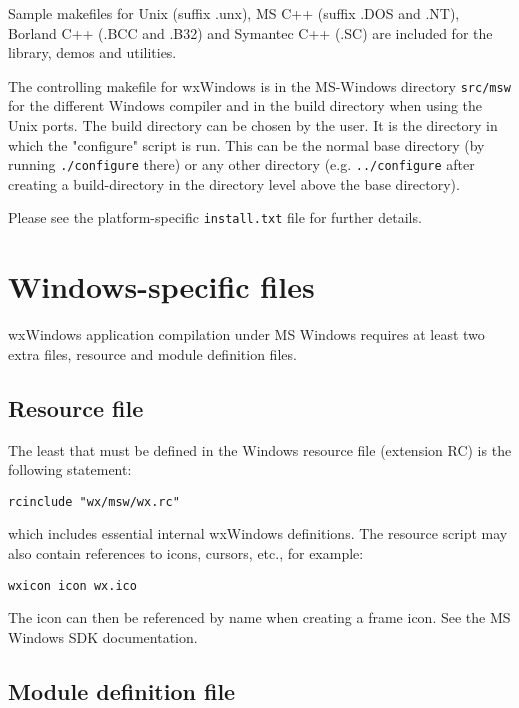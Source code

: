 Sample makefiles for Unix (suffix .unx), MS C++ (suffix .DOS and .NT), Borland
C++ (.BCC and .B32) and Symantec C++ (.SC) are included for the library, demos
and utilities.

The controlling makefile for wxWindows is in the MS-Windows
directory {\tt src/msw} for the different Windows compiler and
in the build directory when using the Unix ports. The build
directory can be chosen by the user. It is the directory in
which the "configure" script is run. This can be the normal
base directory (by running {\tt ./configure} there) or any other
directory (e.g. {\tt ../configure} after creating a build-directory
in the directory level above the base directory).

Please see the platform-specific {\tt install.txt} file for further details.

\section{Windows-specific files}

wxWindows application compilation under MS Windows requires at least two
extra files, resource and module definition files.

\subsection{Resource file}\label{resources}

The least that must be defined in the Windows resource file (extension RC)
is the following statement:

\begin{verbatim}
rcinclude "wx/msw/wx.rc"
\end{verbatim}

which includes essential internal wxWindows definitions.  The resource script
may also contain references to icons, cursors, etc., for example:

\begin{verbatim}
wxicon icon wx.ico
\end{verbatim}

The icon can then be referenced by name when creating a frame icon. See
the MS Windows SDK documentation.


\subsection{Module definition file}

